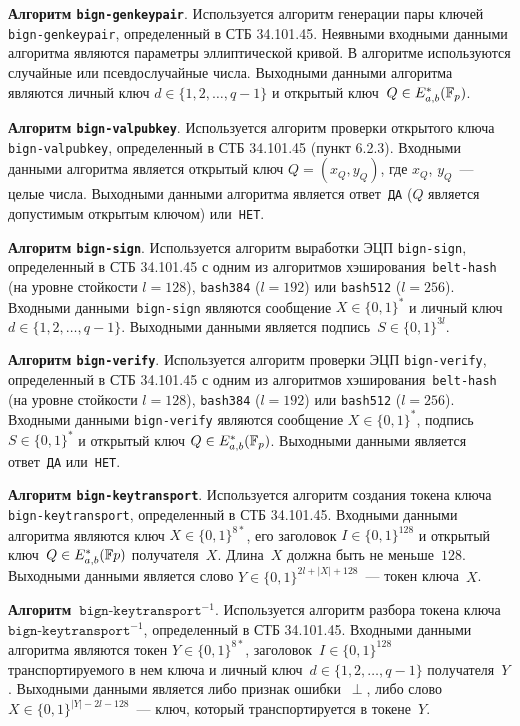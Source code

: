 {\bf Алгоритм \texttt{bign-genkeypair}}.
Используется алгоритм генерации пары ключей 
\texttt{bign-genkeypair}, определенный в СТБ 34.101.45.
Неявными входными данными алгоритма являются параметры эллиптической кривой.
В алгоритме используются случайные или псевдослучайные числа. 
Выходными данными алгоритма являются личный ключ $d\in\{1,2,\ldots,q-1\}$ 
и открытый ключ~$Q\in E_{a,b}^*(\mathbb{F}_p)$.

{\bf Алгоритм \texttt{bign-valpubkey}}.
Используется алгоритм проверки открытого ключа 
\texttt{bign-valpubkey}, определенный в СТБ 34.101.45 (пункт 6.2.3). Входными 
данными алгоритма является открытый ключ $Q = (x_Q, y_Q)$, 
где $x_Q$, $y_Q$~--- целые числа. Выходными данными алгоритма является 
ответ~\texttt{ДА} ($Q$ является допустимым открытым ключом) или~\texttt{НЕТ}.

{\bf Алгоритм \texttt{bign-sign}}. Используется алгоритм выработки ЭЦП 
\texttt{bign-sign}, определенный в СТБ 34.101.45 с одним из алгоритмов
хэширования~\texttt{belt-hash} (на уровне стойкости $l=128$),
\texttt{bash384} ($l=192$) или \texttt{bash512} ($l=256$).
%
Входными данными~\texttt{bign-sign} являются сообщение 
$X\in\{0,1\}^*$ и личный ключ~$d\in\{1,2,\ldots,q-1\}$.
Выходными данными является подпись~$S\in\{0,1\}^{3l}$.

{\bf Алгоритм \texttt{bign-verify}}.
Используется алгоритм проверки ЭЦП \texttt{bign-verify}, 
определенный в СТБ 34.101.45 с одним из алгоритмов 
хэширования~\texttt{belt-hash} (на уровне стойкости $l=128$),  
\texttt{bash384} ($l=192$) или \texttt{bash512} ($l=256$). 
Входными данными \texttt{bign-verify} являются сообщение $X\in\{0,1\}^*$, 
подпись $S\in\{0,1\}^*$ и открытый ключ $Q\in E_{a,b}^*(\mathbb{F}_p)$.
Выходными данными является ответ~\texttt{ДА} или~\texttt{НЕТ}.

{\bf Алгоритм \texttt{bign-keytransport}}.
Используется алгоритм создания токена ключа 
\texttt{bign-keytransport}, определенный в СТБ 34.101.45.
Входными данными алгоритма являются ключ $X\in\{0,1\}^{8*}$, 
его заголовок $I\in\{0,1\}^{128}$ и открытый ключ~$Q\in E_{a,b}^*(\mathbb{F} p)$ 
получателя~$X$. Длина~$X$ должна быть не меньше~$128$.
Выходными данными является слово $Y\in\{0,1\}^{2l+|X|+128}$~--- токен ключа~$X$.
 
{\bf Алгоритм~$\texttt{bign-keytransport}^{-1}$}.
Используется алгоритм разбора токена ключа~$\texttt{bign-keytransport}^{-1}$, 
определенный в СТБ 34.101.45. Входными данными алгоритма являются токен 
$Y\in\{0,1\}^{8*}$, заголовок~$I\in\{0,1\}^{128}$ транспортируемого в нем ключа 
и личный ключ~$d\in\{1,2,\ldots,q-1\}$ получателя~$Y$.
Выходными данными является либо признак ошибки~$\perp$, 
либо слово~$X\in\{0,1\}^{|Y|-2l-128}$~--- ключ, 
который транспортируется в токене~$Y$.

